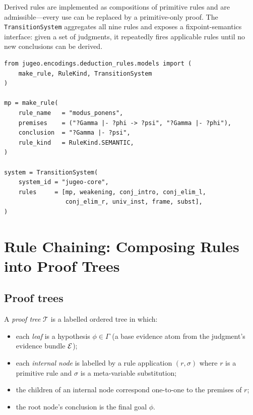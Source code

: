 \documentclass[11pt]{article}
\newcommand{\PTree}{\mathcal{T}}              %
\begin{document}
\noindent
Derived rules are implemented as compositions of primitive rules and
are admissible---every use can be replaced by a primitive-only proof.
The \lstinline|TransitionSystem| aggregates all nine rules and exposes a
fixpoint-semantics interface: given a set of judgments, it repeatedly
fires applicable rules until no new conclusions can be derived.

\begin{lstlisting}[style=jugeo-python,caption={Registering a rule in the transition system.}]
from jugeo.encodings.deduction_rules.models import (
    make_rule, RuleKind, TransitionSystem
)

mp = make_rule(
    rule_name   = "modus_ponens",
    premises    = ("?Gamma |- ?phi -> ?psi", "?Gamma |- ?phi"),
    conclusion  = "?Gamma |- ?psi",
    rule_kind   = RuleKind.SEMANTIC,
)

system = TransitionSystem(
    system_id = "jugeo-core",
    rules     = [mp, weakening, conj_intro, conj_elim_l,
                 conj_elim_r, univ_inst, frame, subst],
)
\end{lstlisting}

\section{Rule Chaining: Composing Rules into Proof Trees}\label{sec:chaining}

\subsection{Proof trees}

A \emph{proof tree} $\PTree$ is a labelled ordered tree in which:
\begin{itemize}
  \item each \emph{leaf} is a hypothesis $\phi \in \Gamma$ (a base
        evidence atom from the judgment's evidence bundle $\mathcal{E}$);
  \item each \emph{internal node} is labelled by a rule application
        $(r, \sigma)$ where $r$ is a primitive rule and $\sigma$ is a
        meta-variable substitution;
  \item the children of an internal node correspond one-to-one to the
        premises of $r$;
  \item the root node's conclusion is the final goal $\phi$.
\end{itemize}
\end{document}
